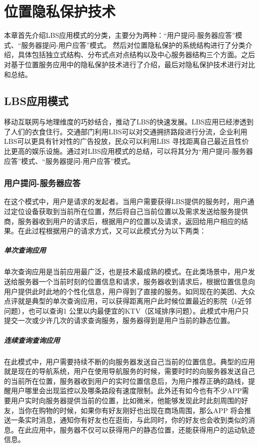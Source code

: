 \chapter{位置隐私保护技术}
\label{chap1}
本章首先介绍LBS应用模式的分类，主要分为两种：“用户提问-服务器应答”模式、“服务器提问-用户应答”模式\cite{zhanghao}。 然后对位置隐私保护的系统结构进行了分类介绍，具体包括独立式结构、分布式点对点结构以及中心服务器结构三个方面。之后对基于位置服务应用中的隐私保护技术进行了介绍，最后对隐私保护技术进行对比和总结。
\section{LBS应用模式}
移动互联网与地理维度的巧妙结合，推动了LBS的快速发展。LBS应用已经渗透到了人们的衣食住行。交通部门利用LBS可以对交通拥挤路段进行分流，企业利用LBS可以更具有针对性的广告投放，民众可以利用LBS 寻找距离自己最近且性价比更高的娱乐设施。通过对LBS应用模式的总结，可以将其分为“用户提问-服务器应答”模式、“服务器提问-用户应答”模式。
\subsection{用户提问-服务器应答}
在这个模式中，用户是请求的发起者。当用户需要获得LBS提供的服务时，用户通过定位设备获取到当前所在位置，然后将自己当前位置以及需求发送给服务提供商，服务器收到用户的请求后，根据用户的位置以及请求，返回给用户相应的结果。在此过程根据用户的请求方式，又可以此模式分为以下两类：
\paragraph{单次查询应用}
单次查询应用是当前应用最广泛，也是技术最成熟的模式。在此类场景中，用户发送给服务器一个当前时刻的位置信息和请求，服务器收到请求后，根据位置信息向用户提供此时此地的个性化信息，用户得到了直接的服务。如同现在的美团、大众点评就是典型的单次查询应用，可以获得距离用户此时候位置最近的影院（$k$近邻问题），也可以查询1 公里以内最便宜的KTV（区域排序问题）。此模式中用户只提交一次或少许几次的请求查询服务，服务器得到是用户当前的静态位置。
\paragraph{连续查询查询应用}
在此模式中，用户需要持续不断的向服务器发送自己当前的位置信息。典型的应用就是现在的导航系统，用户在使用导航服务的时候，需要时时的向服务器发送自己的当前所在位置，服务器收到用户的实时位置信息后，为用户推荐正确的路线，提醒用户哪里会出现监控以及哪条路段有速度限制。此外还有如今也有不少APP需要用户实时向服务器提供当前的位置，比如微米，他能够发现此时此刻周围的好友，当你在购物的时候，如果你有好友刚好也出现在商场周围，那么APP 将会推送一条实时消息，通知你有好友也在逛街，与此同时，你的好友也会收到类似的消息。在此应用中，服务器不仅可以获得用户的静态位置，还能获得用户的运动轨迹信息。

